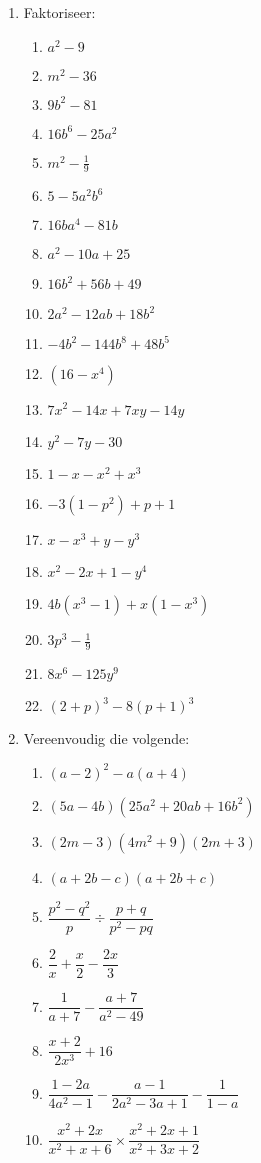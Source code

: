 \begin{eocexercises}{}
\begin{enumerate}[itemsep=5pt, label=\textbf{\arabic*}. ]
\item Faktoriseer:
\begin{multicols}{2}
\begin{enumerate}[itemsep=5pt, label=\textbf{(\alph*)} ] 
\item ${a}^{2}-9$
\item ${m}^{2}-36$
\item $9{b}^{2}-81$
\item $16{b}^{6}-25{a}^{2}$
\item ${m}^{2}-\frac{1}{9}$
\item $5-5{a}^{2}{b}^{6}$
\item $16b{a}^{4}-81b$
\item ${a}^{2}-10a+25$
\item $16{b}^{2}+56b+49$
\item $2{a}^{2}-12ab+18{b}^{2}$
\item $-4{b}^{2}-144{b}^{8}+48{b}^{5}$
\item $(16-{x}^{4})$
\item ${7x}^{2}-14x+7xy-14y$
\item ${y}^{2}-7y-30$
\item $1-x-{x}^{2}+{x}^{3}$
\item $-3(1-{p}^{2})+p+1$
\item $x-x^{3} + y - y^{3}$
\item $x^{2} - 2x + 1 - y^{4}$
\item $4b(x^{3} - 1) + x(1-x^{3})$
\item $3p^{3} - \frac{1}{9}$
\item $8x^6-125y^9$
\item $(2+p)^3- 8(p+1)^3$
\end{enumerate}
\end{multicols}


\item Vereenvoudig die volgende:
\begin{multicols}{2}
\begin{enumerate}[itemsep=5pt, label=\textbf{(\alph*)} ] 

\item ${(a-2)}^{2}-a(a+4)$
\item $(5a-4b)(25{a}^{2}+20ab+16{b}^{2})$
\item $(2m-3)(4{m}^{2}+9)(2m+3)$
\item $(a+2b-c)(a+2b+c)$
\item $\dfrac{{p}^{2}-{q}^{2}}{p}÷\dfrac{p+q}{{p}^{2}-pq}$
\item $\dfrac{2}{x}+\dfrac{x}{2}-\dfrac{2x}{3}$
\item $\dfrac{1}{a+7}-\dfrac{a+7}{a^{2}-49}$
\item $\dfrac{x+2}{2x^{3}} + 16$
\item $\dfrac{1-2a}{4a^{2} -1} - \dfrac{a-1}{2a^{2}-3a+1} - \dfrac{1}{1-a}$
\item $\dfrac{x^{2} + 2x}{x^{2}+ x + 6} \times \dfrac{x^{2} + 2x + 1}{x^{2} + 3x +2}$
\end{enumerate}
\end{multicols}



\end{enumerate}
\end{eocexercises}
